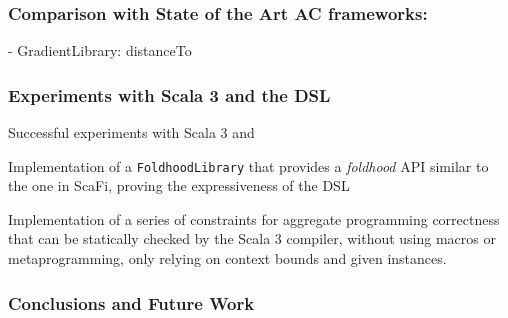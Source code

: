 \begin{frame}
    \frametitle{Comparison with State of the Art \ac{AC} frameworks: \this}
    \begin{exampleblock}{\this - GradientLibrary: distanceTo}
        
    \end{exampleblock}
\end{frame}

\begin{frame}
    \frametitle{Experiments with Scala 3 and the \ac{DSL}}
    \begin{blockitems}{Successful experiments with Scala 3 and \this}
        \item Implementation of a \texttt{FoldhoodLibrary} that provides a \textit{foldhood} \ac{API} similar to the one in ScaFi, proving the expressiveness of the \this \ac{DSL}
        \item Implementation of a series of constraints for aggregate programming correctness that can be statically checked by the Scala 3 compiler, without using macros or metaprogramming, only relying on context bounds and given instances.
    \end{blockitems}
\end{frame}

\begin{frame}
    \frametitle{Conclusions and Future Work}
\end{frame}
